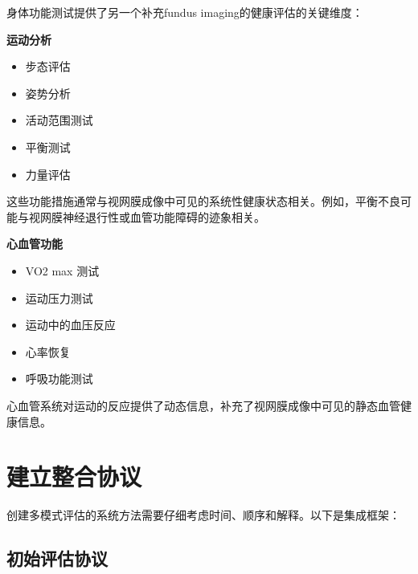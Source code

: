 \documentclass[
  Letterpaper,
]{scrbook}
\providecommand{\tightlist}{%
  \setlength{\itemsep}{0pt}\setlength{\parskip}{0pt}}\usepackage{longtable,booktabs,array}
\begin{document}
身体功能测试提供了另一个补充fundus imaging的健康评估的关键维度：

\textbf{运动分析}

\begin{itemize}
\tightlist
\item
  步态评估
\item
  姿势分析
\item
  活动范围测试
\item
  平衡测试
\item
  力量评估
\end{itemize}

这些功能措施通常与视网膜成像中可见的系统性健康状态相关。例如，平衡不良可能与视网膜神经退行性或血管功能障碍的迹象相关。

\textbf{心血管功能}

\begin{itemize}
\tightlist
\item
  VO2 max 测试
\item
  运动压力测试
\item
  运动中的血压反应
\item
  心率恢复
\item
  呼吸功能测试
\end{itemize}

心血管系统对运动的反应提供了动态信息，补充了视网膜成像中可见的静态血管健康信息。

\section{建立整合协议}\label{ux5efaux7acbux6574ux5408ux534fux8bae}

创建多模式评估的系统方法需要仔细考虑时间、顺序和解释。以下是集成框架：

\subsection{初始评估协议}\label{ux521dux59cbux8bc4ux4f30ux534fux8bae}
\end{document}
